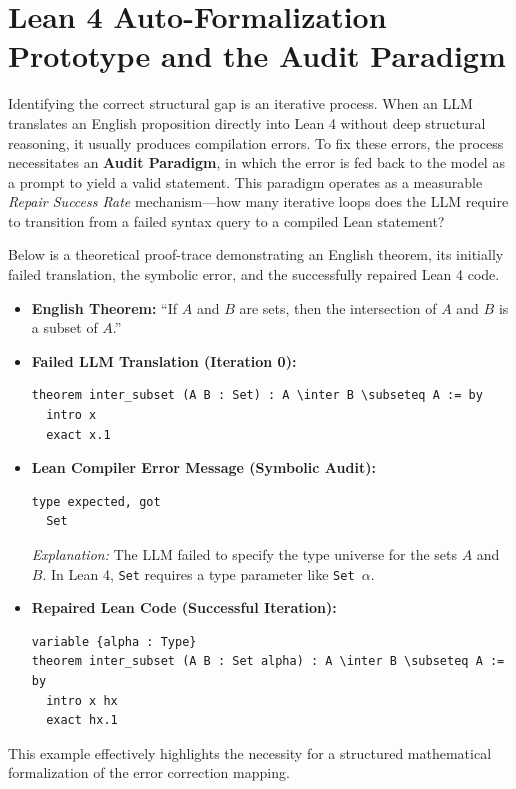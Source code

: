\section{Lean 4 Auto-Formalization Prototype and the Audit Paradigm}
Identifying the correct structural gap is an iterative process. When an LLM translates an English proposition directly into Lean 4 without deep structural reasoning, it usually produces compilation errors. To fix these errors, the process necessitates an \textbf{Audit Paradigm}, in which the error is fed back to the model as a prompt to yield a valid statement. This paradigm operates as a measurable \textit{Repair Success Rate} mechanism—how many iterative loops does the LLM require to transition from a failed syntax query to a compiled Lean statement?

Below is a theoretical proof-trace demonstrating an English theorem, its initially failed translation, the symbolic error, and the successfully repaired Lean 4 code.

\begin{itemize}
    \item \textbf{English Theorem:} ``If $A$ and $B$ are sets, then the intersection of $A$ and $B$ is a subset of $A$.''
    \item \textbf{Failed LLM Translation (Iteration 0):}
\begin{verbatim}
theorem inter_subset (A B : Set) : A \inter B \subseteq A := by
  intro x
  exact x.1
\end{verbatim}
    \item \textbf{Lean Compiler Error Message (Symbolic Audit):}
\begin{verbatim}
type expected, got
  Set
\end{verbatim}
    \textit{Explanation:} The LLM failed to specify the type universe for the sets $A$ and $B$. In Lean 4, \texttt{Set} requires a type parameter like \texttt{Set $\alpha$}.
    \item \textbf{Repaired Lean Code (Successful Iteration):}
\begin{verbatim}
variable {alpha : Type}
theorem inter_subset (A B : Set alpha) : A \inter B \subseteq A := by
  intro x hx
  exact hx.1
\end{verbatim}
\end{itemize}
This example effectively highlights the necessity for a structured mathematical formalization of the error correction mapping.